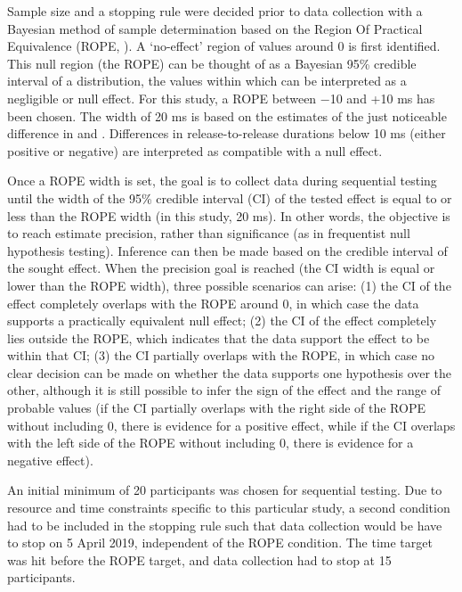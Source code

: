 \documentclass[12pt,a4paper,]{article}
\begin{document}
\label{s:sample-size}

Sample size and a stopping rule were decided prior to data collection
with a Bayesian method of sample determination based on the Region Of
Practical Equivalence (ROPE, \citealt{kruschke2015, vasishth2018a}). A
`no-effect' region of values around 0 is first identified. This null
region (the ROPE) can be thought of as a Bayesian 95\% credible interval
of a distribution, the values within which can be interpreted as a
negligible or null effect. For this study, a ROPE between −10 and +10 ms
has been chosen. The width of 20 ms is based on the estimates of the
just noticeable difference in \citet{huggins1972} and
\citet{nooteboom1980}. Differences in release-to-release durations below
10 ms (either positive or negative) are interpreted as compatible with a
null effect.

Once a ROPE width is set, the goal is to collect data during sequential
testing until the width of the 95\% credible interval (CI) of the tested
effect is equal to or less than the ROPE width (in this study, 20 ms).
In other words, the objective is to reach estimate precision, rather
than significance (as in frequentist null hypothesis testing). Inference
can then be made based on the credible interval of the sought effect.
When the precision goal is reached (the CI width is equal or lower than
the ROPE width), three possible scenarios can arise: (1) the CI of the
effect completely overlaps with the ROPE around 0, in which case the
data supports a practically equivalent null effect; (2) the CI of the
effect completely lies outside the ROPE, which indicates that the data
support the effect to be within that CI; (3) the CI partially overlaps
with the ROPE, in which case no clear decision can be made on whether
the data supports one hypothesis over the other, although it is still
possible to infer the sign of the effect and the range of probable
values (if the CI partially overlaps with the right side of the ROPE
without including 0, there is evidence for a positive effect, while if
the CI overlaps with the left side of the ROPE without including 0,
there is evidence for a negative effect).

An initial minimum of 20 participants was chosen for sequential testing.
Due to resource and time constraints specific to this particular study,
a second condition had to be included in the stopping rule such that
data collection would be have to stop on 5 April 2019, independent of
the ROPE condition. The time target was hit before the ROPE target, and
data collection had to stop at 15 participants.
\end{document}
